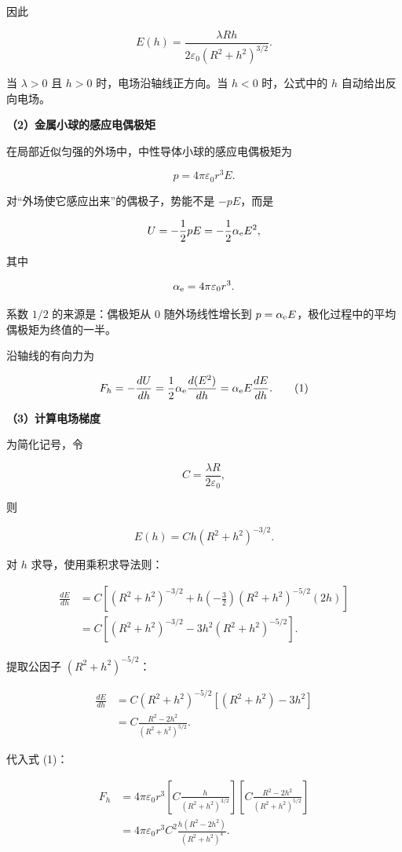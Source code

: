 \documentclass[12pt,a4paper,UTF8]{ctexart}
\begin{document}
因此

\[
\boxed{E(h)=\frac{\lambda Rh}{2\varepsilon_0(R^2+h^2)^{3/2}}}.
\]

当 \(\lambda>0\) 且 \(h>0\) 时，电场沿轴线正方向。当 \(h<0\)
时，公式中的 \(h\) 自动给出反向电场。

\textbf{（2）金属小球的感应电偶极矩}

在局部近似匀强的外场中，中性导体小球的感应电偶极矩为

\[
p=4\pi\varepsilon_0r^3E.
\]

对``外场使它感应出来''的偶极子，势能不是 \(-pE\)，而是

\[
U=-\frac12pE=-\frac12\alpha_{\rm e}E^2,
\]

其中

\[
\alpha_{\rm e}=4\pi\varepsilon_0r^3.
\]

系数 \(1/2\) 的来源是：偶极矩从 0 随外场线性增长到
\(p=\alpha_{\rm e}E\)，极化过程中的平均偶极矩为终值的一半。

沿轴线的有向力为

\[
F_h=-\frac{dU}{dh}
=\frac12\alpha_{\rm e}\frac{d(E^2)}{dh}
=\alpha_{\rm e}E\frac{dE}{dh}. \tag{1}
\]

\textbf{（3）计算电场梯度}

为简化记号，令

\[
C=\frac{\lambda R}{2\varepsilon_0},
\]

则

\[
E(h)=Ch(R^2+h^2)^{-3/2}.
\]

对 \(h\) 求导，使用乘积求导法则：

\[
\begin{aligned}
\frac{dE}{dh}
&=C\left[(R^2+h^2)^{-3/2}
+h\left(-\frac32\right)(R^2+h^2)^{-5/2}(2h)\right]\\
&=C\left[(R^2+h^2)^{-3/2}
-3h^2(R^2+h^2)^{-5/2}\right].
\end{aligned}
\]

提取公因子 \((R^2+h^2)^{-5/2}\)：

\[
\begin{aligned}
\frac{dE}{dh}
&=C(R^2+h^2)^{-5/2}
\left[(R^2+h^2)-3h^2\right]\\
&=C\frac{R^2-2h^2}{(R^2+h^2)^{5/2}}.
\end{aligned}
\]

代入式 (1)：

\[
\begin{aligned}
F_h
&=4\pi\varepsilon_0r^3
\left[C\frac{h}{(R^2+h^2)^{3/2}}\right]
\left[C\frac{R^2-2h^2}{(R^2+h^2)^{5/2}}\right]\\
&=4\pi\varepsilon_0r^3C^2
\frac{h(R^2-2h^2)}{(R^2+h^2)^4}.
\end{aligned}
\]
\end{document}
